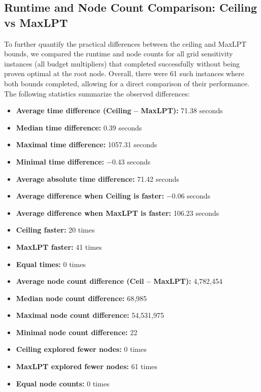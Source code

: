 \subsection{Runtime and Node Count Comparison: Ceiling vs MaxLPT}

To further quantify the practical differences between the ceiling and MaxLPT bounds, 
we compared the runtime and node counts for all grid sensitivity instances (all budget multipliers) that completed successfully without being proven optimal at the root node.
Overall, there were 61 such instances where both bounds completed, allowing for a direct comparison of their performance.
 The following statistics summarize the observed differences:

\begin{itemize}
    \item \textbf{Average time difference (Ceiling -- MaxLPT):} 71.38 seconds
    \item \textbf{Median time difference:} 0.39 seconds
    \item \textbf{Maximal time difference:} 1057.31 seconds
    \item \textbf{Minimal time difference:} $-$0.43 seconds
    \item \textbf{Average absolute time difference:} 71.42 seconds
    \item \textbf{Average difference when Ceiling is faster:} $-$0.06 seconds
    \item \textbf{Average difference when MaxLPT is faster:} 106.23 seconds
    \item \textbf{Ceiling faster:} 20 times
    \item \textbf{MaxLPT faster:} 41 times
    \item \textbf{Equal times:} 0 times
    \item \textbf{Average node count difference (Ceil -- MaxLPT):} 4,782,454
    \item \textbf{Median node count difference:} 68,985
    \item \textbf{Maximal node count difference:} 54,531,975
    \item \textbf{Minimal node count difference:} 22
    \item \textbf{Ceiling explored fewer nodes:} 0 times
    \item \textbf{MaxLPT explored fewer nodes:} 61 times
    \item \textbf{Equal node counts:} 0 times
\end{itemize}


